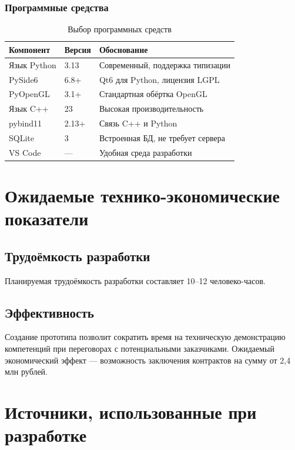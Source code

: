 \documentclass[12pt, a4paper]{article}
\begin{document}
\subsubsection{Программные средства}
\begin{table}[h]
    \centering
    \begin{tabular}{|p{4cm}|p{3cm}|p{8cm}|}
        \hline
        \textbf{Компонент} & \textbf{Версия} & \textbf{Обоснование} \\
        \hline
        Язык Python & 3.13 & Современный, поддержка типизации \\
        \hline
        PySide6 & 6.8+ & Qt6 для Python, лицензия LGPL \\
        \hline
        PyOpenGL & 3.1+ & Стандартная обёртка OpenGL \\
        \hline
        Язык C++ & 23 & Высокая производительность \\
        \hline
        pybind11 & 2.13+ & Связь C++ и Python \\
        \hline
        SQLite & 3 & Встроенная БД, не требует сервера \\
        \hline
        VS Code & — & Удобная среда разработки \\
        \hline
    \end{tabular}
    \caption{Выбор программных средств}
\end{table}

\section{Ожидаемые технико-экономические показатели}

\subsection{Трудоёмкость разработки}
Планируемая трудоёмкость разработки составляет 10–12 человеко-часов.

\subsection{Эффективность}
Создание прототипа позволит сократить время на техническую демонстрацию компетенций при переговорах с потенциальными заказчиками. Ожидаемый экономический эффект — возможность заключения контрактов на сумму от 2,4 млн рублей.

\section{Источники, использованные при разработке}
\end{document}
